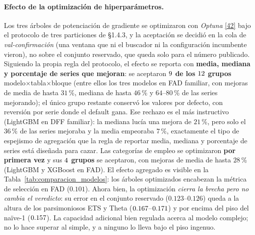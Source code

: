 \documentclass[12pt,letterpaper]{report}
\newcommand{\cita}[1]{\hyperref[bib:#1]{[#1]}}
\begin{document}
\paragraph{Efecto de la optimización de hiperparámetros.} Los tres árboles de
potenciación de gradiente se optimizaron con \textit{Optuna} \cita{42} bajo el protocolo
de tres particiones de §1.4.3, y la aceptación se decidió en la cola de
\textit{val-confirmación} (una ventana que ni el buscador ni la configuración incumbente
vieron), no sobre el conjunto reservado, que queda solo para el número publicado.
Siguiendo la propia regla del protocolo, el efecto se reporta con \textbf{media, mediana y
porcentaje de series que mejoran}: se aceptaron \textbf{$9$ de los $12$ grupos}
modelo$\times$tabla$\times$bloque (entre ellos los tres modelos en FAD familiar, con
mejoras de media de hasta $31$\,\%, mediana de hasta $46$\,\% y $64$--$80$\,\% de las
series mejorando); el único grupo restante conservó los valores
por defecto, con reversión por serie donde el default gana. Ese rechazo es el más instructivo
(LightGBM en DFF familiar): la mediana lucía una mejora de $21$\,\%, pero solo el
$36$\,\% de las series mejoraba y la media empeoraba $7$\,\%, exactamente el tipo de
espejismo de agregación que la regla de reportar media, mediana y porcentaje de series
está diseñada para cazar. Las categorías de empleo se
optimizaron \textbf{por primera vez} y sus \textbf{$4$ grupos} se
aceptaron, con mejoras de media de hasta $28$\,\% (LightGBM y XGBoost en FAD). El efecto agregado es visible en la
Tabla~\ref{tab:comparacion_modelos}: los árboles optimizados encabezan la métrica de
selección en FAD ($0.101$). Ahora bien, la optimización \textit{cierra la brecha pero no
cambia el veredicto}: su error en el conjunto reservado ($0.123$--$0.126$) queda a la
altura de los parsimoniosos ETS y Theta ($0.167$--$0.171$) y por
encima del piso del naïve-1 ($0.157$). La capacidad adicional bien regulada acerca al
modelo complejo; no lo hace superar al simple, y a ninguno lo lleva bajo el piso ingenuo.
\end{document}
